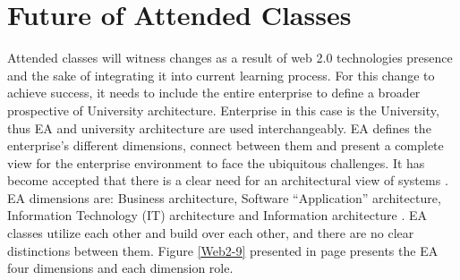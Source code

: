 \documentclass[12pt,a4paper,final,twoside,onecolumn,titlepage]{book}
\begin{document}
\section{Future of Attended Classes}
Attended classes will witness changes as a result of web 2.0 technologies presence and the sake of integrating it into current learning process. For this change to achieve success, it needs to include the entire enterprise to define a broader prospective of University architecture. Enterprise in this case is the University, thus \gls{EA} and university architecture are used interchangeably. \gls{EA} defines the enterprise’s different dimensions, connect between them and present a complete view for the enterprise environment to face the ubiquitous challenges. It has become accepted that there is a clear need for an architectural view of systems \cite{M01}. \gls{EA} dimensions are: Business architecture, Software “Application” architecture, Information Technology (IT) architecture and Information architecture \cite{W26}. \gls{EA} classes utilize each other and build over each other, and there are no clear distinctions between them. Figure \ref{Web2-9} presented in page \pageref{Web2-9} presents the \gls{EA} four dimensions and each dimension role.
\end{document}
